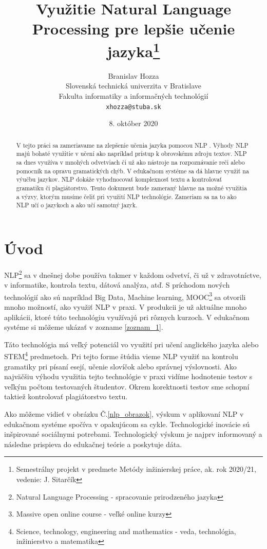 \documentclass[10pt,slovak,a4paper,twoside]{article}
\title{Využitie Natural Language Processing pre lepšie učenie jazyka\thanks{Semestrálny projekt v predmete Metódy inžinierskej práce, ak. rok 2020/21, vedenie: J. Sitarčík}}
\author{Branislav Hozza\\[2pt]
	{\small Slovenská technická univerzita v Bratislave}\\
	{\small Fakulta informatiky a informačných technológií}\\
	{\small \texttt{xhozza@stuba.sk}}
	}
\date{\small 8. október 2020}
\begin{document}
\maketitle
\begin{abstract}
	V tejto práci sa zameriavame na zlepšenie učenia jazyka pomocou NLP \cite{litman2016natural}. 
	Výhody NLP majú bohaté využitie v učení ako napríklad prístup k obrovskému zdroju textov. 
	NLP sa dnes využíva v mnohých odvetviach či už ako nástroje na rozpoznávanie reči alebo pomocník na opravu gramatických chýb. 
	V edukačnom systéme sa dá hlavne využiť na výučbu jazykov. NLP dokáže vyhodnocovať komplexnosť textu a kontrolovať gramatiku či plagiátorstvo. 
	Tento dokument bude zameraný hlavne na možné využitia a výzvy, ktorým musíme čeliť pri využití NLP technológie. 
	Zameriam sa na to ako NLP učí o jazykoch a ako učí samotný jazyk.
\end{abstract}
\section{Úvod}\label{uvod}
NLP\footnote{Natural Language Processing - spracovanie prirodzeného jazyka} sa v dnešnej dobe používa takmer v každom odvetví, či už v zdravotníctve, 
v informatike, kontrola textu, dátová analýza, atď. S príchodom nových technológií ako sú napríklad Big Data, Machine learning, 
MOOC\footnote{Massive open online course - veľké online kurzy} sa otvorili mnoho možností, ako využiť NLP v praxi. 
V produkcii je už aktuálne mnoho aplikácii, ktoré túto technológiu využívajú pri rôznych kurzoch.
V edukačnom systéme si môžeme ukázať v zozname \ref{zoznam_1}.

Táto technológia má veľký potenciál vo využití pri učení anglického jazyka 
alebo STEM\footnote{Science, technology, engineering and mathematics - veda, technológia, inžinierstvo a matematika} predmetoch. 
Pri tejto forme štúdia vieme NLP využiť na kontrolu gramatiky pri písaní esejí, učenie slovíčok alebo správnej výslovnosti.
Ako najväčšiu výhodu využitia tejto technológie v praxi vidíme hodnotenie testov s veľkým počtom testovaných študentov. 
Okrem korektnosti testov sme schopní taktiež kontrolovať plagiátorstvo textu.

Ako môžeme vidieť v obrázku Č.\ref{nlp_obrazok}, výskum v aplikovaní NLP v edukačnom systéme spočíva v opakujúcom sa cykle. 
Technologické inovácie sú inšpirované sociálnymi potrebami. Technologický výskum je najprv informovaný a následne prispieva 
do edukačnej teórie a poskytuje dáta.
\end{document}
